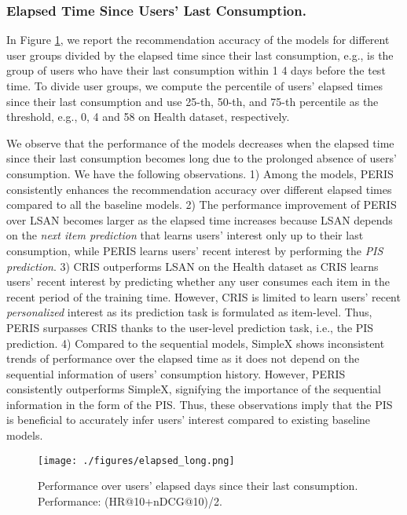 \documentclass[sigconf]{acmart}
\newcommand{\MD}{{\small\textsf{PERIS}}}
\begin{document}
\subsubsection{\textbf{Elapsed Time Since Users' Last Consumption.}}
 In Figure \ref{fig:elap}, we report the recommendation accuracy of the models for different user groups divided by the elapsed time since their last consumption, e.g.,  is the group of users who have their last consumption within 1  4 days before the test time. To divide user groups, we compute the percentile of users' elapsed times since their last consumption and use 25-th, 50-th, and 75-th percentile as the threshold, e.g., 0, 4 and 58 on Health dataset, respectively. 
 
We observe that the performance of the models decreases when the elapsed time since their last consumption becomes long due to the prolonged absence of users' consumption. We have the following observations. 
1) Among the models, \MD{} consistently enhances the recommendation accuracy over different elapsed times compared to all the baseline models. 
2) The performance improvement of \MD{} over LSAN becomes larger as the elapsed time increases because LSAN depends on the \textit{next item prediction} that learns users' interest only up to their last consumption, while \MD{} learns users' recent interest by performing the \textit{PIS prediction}.
3) CRIS outperforms LSAN on the Health dataset as CRIS learns users' recent interest by predicting whether any user consumes each item in the recent period of the training time. 
However, CRIS is limited to learn users' recent \textit{personalized} interest as its prediction task is formulated as item-level. Thus, \MD{} surpasses CRIS thanks to the user-level prediction task, i.e., the PIS prediction. 
4) Compared to the sequential models, SimpleX shows inconsistent trends of performance over the elapsed time as it does not depend on the sequential information of users' consumption history.
However, \MD{} consistently outperforms SimpleX, signifying the importance of the sequential information in the form of the PIS. 
Thus, these observations imply that the PIS is beneficial to accurately infer users' interest compared to existing baseline models.

\begin{figure}[t]
	\centering
	\texttt{[image: ./figures/elapsed\_long.png]}
	\caption{Performance over users' elapsed days since their last consumption. Performance: (HR@10+nDCG@10)/2.}
	\label{fig:elap}
\end{figure}
\end{document}
